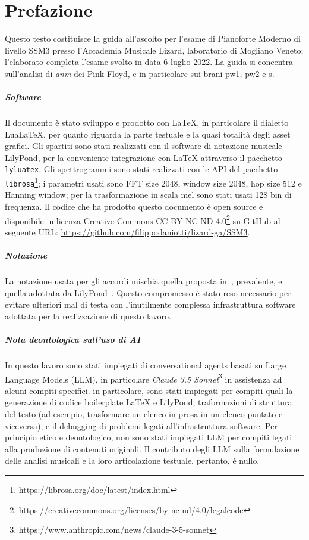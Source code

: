 \documentclass[class=book, crop=false, oneside, 12pt]{standalone}
\begin{document}
\chapter*{Prefazione}

Questo testo costituisce la guida all'ascolto per l'esame di Pianoforte Moderno di livello SSM3 presso l'Accademia Musicale Lizard, laboratorio di Mogliano Veneto; l'elaborato completa l'esame svolto in data 6 luglio 2022. La guida si concentra sull'analisi di \emph{\acrlong{anm}} dei Pink Floyd, e in particolare sui brani \acrlong{pw1}, \acrlong{pw2} e \acrlong{s}.

\paragraph{Software}
Il documento è stato sviluppo e prodotto con LaTeX, in particolare il dialetto LuaLaTeX, per quanto riguarda la parte testuale e la quasi totalità degli asset grafici. Gli spartiti sono stati realizzati con il software di notazione musicale LilyPond, per la conveniente integrazione con LaTeX attraverso il pacchetto \texttt{lyluatex}. Gli spettrogrammi sono stati realizzati con le API del pacchetto \texttt{librosa}\footnote{https://librosa.org/doc/latest/index.html}; i parametri usati sono FFT size 2048, window size 2048, hop size 512 e Hanning window; per la trasformazione in scala mel sono stati usati 128 bin di frequenza. Il codice che ha prodotto questo documento è open source e disponibile in licenza Creative Commons CC BY-NC-ND 4.0\footnote{https://creativecommons.org/licenses/by-nc-nd/4.0/legalcode} su GitHub al seguente URL: \url{https://github.com/filippodaniotti/lizard-ga/SSM3}.

\paragraph{Notazione}
La notazione usata per gli accordi mischia quella proposta in~\cite{brachi2008armonia}, prevalente, e quella adottata da LilyPond~\cite{res:lily-chord-chart}. Questo compromesso è stato reso necessario per evitare ulteriori mal di testa con l'inutilmente complessa infrastruttura software adottata per la realizzazione di questo lavoro.

\paragraph{Nota deontologica sull'uso di AI}
In questo lavoro sono stati impiegati di conversational agents basati su Large Language Models (LLM), in particolare \emph{Claude 3.5 Sonnet}\footnote{https://www.anthropic.com/news/claude-3-5-sonnet} in assistenza ad alcuni compiti specifici. in particolare, sono stati impiegati per compiti quali la generazione di codice boilerplate LaTeX e LilyPond, traformazioni di struttura del testo (ad esempio, trasformare un elenco in prosa in un elenco puntato e viceversa), e il debugging di problemi legati all'infrastruttura software. Per principio etico e deontologico, non sono stati impiegati LLM per compiti legati alla produzione di contenuti originali. Il contributo degli LLM sulla formulazione delle analisi musicali e la loro articolazione testuale, pertanto, è nullo.
\end{document}

